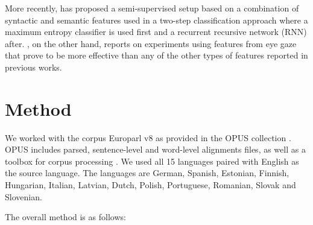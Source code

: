 \documentclass[10pt, a4paper]{article} \usepackage{lrec} \usepackage{multibib}
\begin{document}
More recently,  \cite{Loaiciga2017itrnn} has proposed a semi-supervised setup based on a
combination of syntactic and semantic features used in a two-step classification
approach where a maximum entropy classifier is used first and a recurrent
recursive network (RNN) after. \cite{yaneva-etal-2018-classifying}, on the other
hand, reports on experiments using features from eye gaze that prove to be more
effective than any of the other types of features reported in previous works.




\section{Method}

We worked with the corpus Europarl \cite{Koehn2005} v8 as provided in the OPUS 
collection \cite{TIEDEMANN12.463}. OPUS includes parsed, sentence-level 
and word-level alignments files, as well as a toolbox for corpus processing 
\cite{aulamo-et-al-opus}. We used all 15 languages paired with English as the 
source language. The languages are German, Spanish, Estonian, Finnish, 
Hungarian, Italian, Latvian, Dutch, Polish, Portuguese, Romanian, Slovak and 
Slovenian.  

The overall method is as follows:
\end{document}
